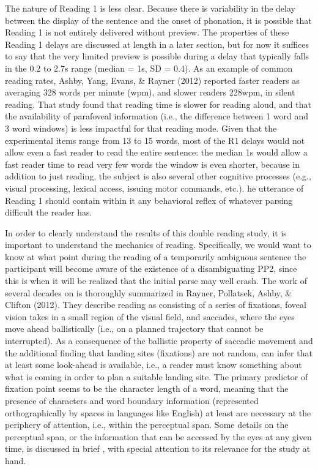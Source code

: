 \documentclass[12pt,oneside]{book}
\begin{document}
The nature of Reading 1 is less clear. Because there is variability in the delay between the display of the sentence and the onset of phonation, it is possible that Reading 1 is not entirely delivered without preview. The properties of these Reading 1 delays are discussed at length in a later section, but for now it suffices to say that the very limited preview is possible during a delay that typically falls in the 0.2 to 2.7s range (median = 1s, SD = 0.4). As an example of common reading rates, Ashby, Yang, Evans, \& Rayner (2012) reported faster readers as averaging 328 words per minute (wpm), and slower readers 228\added{ }wpm, in silent reading. That study found that reading time is slower for reading aloud, and that the availability of parafoveal information (i.e., the difference between 1 word and 3 word windows) is less impactful for that reading mode. Given that the experimental items range from 13 to 15 words, most of the R1 delays would not allow even a fast reader to read the entire sentence: the median  1s  would allow a fast reader time to read very few words the window is even shorter, because in addition to just reading, the subject is also  several other cognitive processes (e.g., visual processing, lexical access, issuing motor commands, etc.). he utterance of Reading 1 should contain within it any behavioral reflex of whatever  parsing difficult the reader has.

In order to clearly understand the results of this double reading study, it is important to understand the mechanics of reading. Specifically, we would want to know at what point during the reading of a temporarily ambiguous sentence the participant will become aware of the existence of a disambiguating PP2, since this is when it will be realized that the initial parse may well crash. The work of several decades on  is thoroughly summarized in Rayner, Pollatsek, Ashby, \& Clifton (2012). They describe reading as consisting of a series of fixations,  foveal vision takes in a small region of the visual field, and saccades, where the eyes move ahead ballistically (i.e., on a planned trajectory that cannot be interrupted). As a consequence of the ballistic property of saccadic movement and the additional finding that landing sites (fixations) are not random,  can  infer that at least some look-ahead is available, i.e., a reader must know something about what is coming in order to plan a suitable landing site. The primary predictor of fixation point seems to be the character length of a word, meaning that the presence of characters and word boundary information (represented orthographically by spaces in languages like English) at least are necessary at the periphery of attention, i.e., within the perceptual span. Some details on the perceptual span, or the information that can be accessed by the eyes at any given time, is discussed in brief , with special attention to its relevance for the study at hand.
\end{document}
